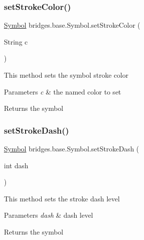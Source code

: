 \subsubsection{\texorpdfstring{set\+Stroke\+Color()}{setStrokeColor()}\hspace{0.1cm}{\footnotesize\ttfamily [2/2]}}
{\footnotesize\ttfamily \hyperlink{classbridges_1_1base_1_1_symbol}{Symbol} bridges.\+base.\+Symbol.\+set\+Stroke\+Color (\begin{DoxyParamCaption}\item[{String}]{c }\end{DoxyParamCaption})}

This method sets the symbol stroke color


\begin{DoxyParams}{Parameters}
{\em c} & the named color to set \\
\hline
\end{DoxyParams}
\begin{DoxyReturn}{Returns}
the symbol 
\end{DoxyReturn}
\mbox{\label{classbridges_1_1base_1_1_symbol_ad36224ec7cb588dbbaa8040ef59ffbfc}} 
\subsubsection{\texorpdfstring{set\+Stroke\+Dash()}{setStrokeDash()}}
{\footnotesize\ttfamily \hyperlink{classbridges_1_1base_1_1_symbol}{Symbol} bridges.\+base.\+Symbol.\+set\+Stroke\+Dash (\begin{DoxyParamCaption}\item[{int}]{dash }\end{DoxyParamCaption})}

This method sets the stroke dash level


\begin{DoxyParams}{Parameters}
{\em dash} & dash level \\
\hline
\end{DoxyParams}
\begin{DoxyReturn}{Returns}
the symbol 
\end{DoxyReturn}
\mbox{\label{classbridges_1_1base_1_1_symbol_a4b1ce1fdbc8e76538e67a292e150083c}} 
